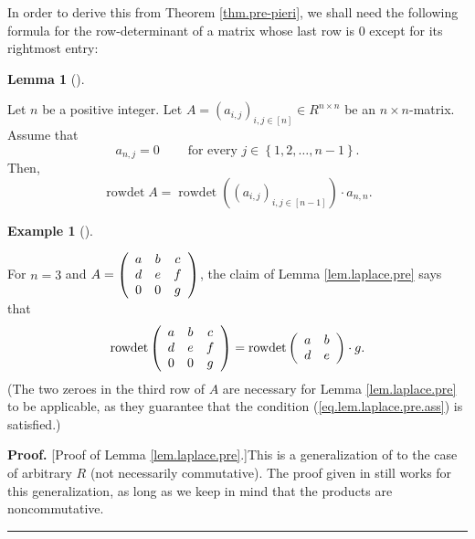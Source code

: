 \documentclass[numbers=enddot,12pt,final,onecolumn,notitlepage,english]{scrartcl}%
\theoremstyle{definition}
\newtheorem{lem}[theo]{Lemma}
\newenvironment{lemma}[1][]
{\begin{lem}[#1]\begin{leftbar}}
{\end{leftbar}\end{lem}}
\newtheorem{exam}[theo]{Example}
\newenvironment{example}[1][]
{\begin{exam}[#1]\begin{leftbar}}
{\end{leftbar}\end{exam}}
\newenvironment{proof}[1][Proof]{\noindent\textbf{#1.} }{\ \rule{0.5em}{0.5em}}
\newenvironment{vershort}{}{}
\begin{document}
In order to derive this from Theorem \ref{thm.pre-pieri}, we shall need the
following formula for the row-determinant of a matrix whose last row is $0$
except for its rightmost entry:

\begin{lemma}
\label{lem.laplace.pre}Let $n$ be a positive integer. Let $A=\left(
a_{i,j}\right)  _{i,j\in\left[  n\right]  }\in R^{n\times n}$ be an $n\times
n$-matrix. Assume that%
\begin{equation}
a_{n,j}=0\ \ \ \ \ \ \ \ \ \ \text{for every }j\in\left\{  1,2,\ldots
,n-1\right\}  . \label{eq.lem.laplace.pre.ass}%
\end{equation}
Then,
\[
\operatorname*{rowdet}A=\operatorname*{rowdet}\left(  \left(  a_{i,j}\right)
_{i,j\in\left[  n-1\right]  }\right)  \cdot a_{n,n}.
\]

\end{lemma}

\begin{example}
For $n=3$ and $A=\left(
\begin{array}
[c]{ccc}%
a & b & c\\
d & e & f\\
0 & 0 & g
\end{array}
\right)  $, the claim of Lemma \ref{lem.laplace.pre} says that%
\[
\operatorname*{rowdet}\left(
\begin{array}
[c]{ccc}%
a & b & c\\
d & e & f\\
0 & 0 & g
\end{array}
\right)  =\operatorname*{rowdet}\left(
\begin{array}
[c]{cc}%
a & b\\
d & e
\end{array}
\right)  \cdot g.
\]
(The two zeroes in the third row of $A$ are necessary for Lemma
\ref{lem.laplace.pre} to be applicable, as they guarantee that the condition
(\ref{eq.lem.laplace.pre.ass}) is satisfied.)
\end{example}

\begin{vershort}
\begin{proof}
[Proof of Lemma \ref{lem.laplace.pre}.]This is a generalization of
\cite[Theorem 6.43]{detnotes} to the case of arbitrary $R$ (not necessarily
commutative). The proof given in \cite{detnotes} still works for this
generalization, as long as we keep in mind that the products are noncommutative.
\end{proof}
\end{vershort}
\end{document}
